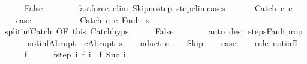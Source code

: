 \begin{isabellebody}
\ \ \ \ \isamarkupfalse%
\ False\isanewline
\ \ \ \ \ \ \isamarkupfalse%
\ {\isacharparenleft}fastforce\ elim{\isacharcolon}\ Skip{\isacharunderscore}no{\isacharunderscore}step\ step{\isacharunderscore}elim{\isacharunderscore}cases{\isacharparenright}\isanewline
\ \ \isamarkupfalse%
\isanewline
{}\isamarkupfalse%
\isanewline
\ \ \isamarkupfalse%
\ {\isacharparenleft}Catch\ c\ c\isanewline
\ \ \isamarkupfalse%
\ {\isacharquery}case\isanewline
\ \ \isamarkupfalse%
\ \isanewline
\ \ \ \ \isamarkupfalse%
\ {\isachardoublequoteopen}{\isasymGamma}{\isasymturnstile}\ {\isacharparenleft}Catch\ c\ c\ Fault\ x{\isacharparenright}\ {\isasymrightarrow}\ {\isasymdots}{\isacharparenleft}{\isasyminfinity}{\isacharparenright}{\isachardoublequoteclose}\isanewline
\ \ \ \ \isamarkupfalse%
\ split{\isacharunderscore}inf{\isacharunderscore}Catch\ {\isacharbrackleft}OF\ this{\isacharbrackright}\ Catch{\isachardot}hyps\isanewline
\ \ \ \ \isamarkupfalse%
\ False\isanewline
\ \ \ \ \ \ \isamarkupfalse%
\ {\isacharparenleft}auto\ dest{\isacharcolon}\ steps{\isacharunderscore}Fault{\isacharunderscore}prop{\isacharparenright}\isanewline
\ \ \isamarkupfalse%
\ \ \isanewline
{}\isamarkupfalse%
%
\endisatagproof
{\isafoldproof}%
%
\isadelimproof
\isanewline
%
\endisadelimproof
\isanewline
{}\isamarkupfalse%
\ not{\isacharunderscore}inf{\isacharunderscore}Abrupt{\isacharcolon}\ {\isachardoublequoteopen}{\isasymnot}\ {\isasymGamma}{\isasymturnstile}{\isacharparenleft}c{\isacharcomma}Abrupt\ s{\isacharparenright}\ {\isasymrightarrow}\ {\isasymdots}{\isacharparenleft}{\isasyminfinity}{\isacharparenright}{\isachardoublequoteclose}\isanewline
%
\isadelimproof
%
\endisadelimproof
%
\isatagproof
{}\isamarkupfalse%
\ {\isacharparenleft}induct\ c{\isacharparenright}\isanewline
\ \ \isamarkupfalse%
\ Skip\isanewline
\ \ \isamarkupfalse%
\ {\isacharquery}case\isanewline
\ \ \isamarkupfalse%
\ {\isacharparenleft}rule\ not{\isacharunderscore}infI{\isacharparenright}\isanewline
\ \ \ \ \isamarkupfalse%
\ f\isanewline
\ \ \ \ \isamarkupfalse%
\ f{\isacharunderscore}step{\isacharcolon}\ {\isachardoublequoteopen}{\isasymAnd}i{\isachardot}\ {\isasymGamma}{\isasymturnstile}f\ i\ {\isasymrightarrow}\ f\ {\isacharparenleft}Suc\ i{\isacharparenright}{\isachardoublequoteclose}\isanewline

\end{isabellebody}
